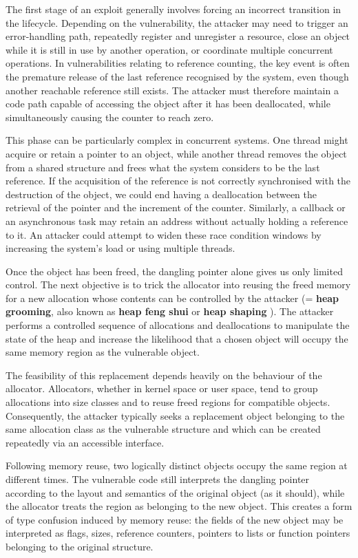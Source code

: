 \noindent The first stage of an exploit generally involves forcing an incorrect transition in the lifecycle. Depending on the vulnerability, the attacker may need to trigger an error-handling path, repeatedly register and unregister a resource, close an object while it is still in use by another operation, or coordinate multiple concurrent operations. In vulnerabilities relating to reference counting, the key event is often the premature release of the last reference recognised by the system, even though another reachable reference still exists. The attacker must therefore maintain a code path capable of accessing the object after it has been deallocated, while simultaneously causing the counter to reach zero.

This phase can be particularly complex in concurrent systems. One thread might acquire or retain a pointer to an object, while another thread removes the object from a shared structure and frees what the system considers to be the last reference. If the acquisition of the reference is not correctly synchronised with the destruction of the object, we could end having a deallocation between the retrieval of the pointer and the increment of the counter. Similarly, a callback or an asynchronous task may retain an address without actually holding a reference to it. An attacker could attempt to widen these race condition windows by increasing the system's load or using multiple threads.

Once the object has been freed, the dangling pointer alone gives us only limited control. The next objective is to trick the allocator into reusing the freed memory for a new allocation whose contents can be controlled by the attacker (= \textbf{heap grooming}, also known as \textbf{heap feng shui} or \textbf{heap shaping} \cite{bib:heap-grooming}). The attacker performs a controlled sequence of allocations and deallocations to manipulate the state of the heap and increase the likelihood that a chosen object will occupy the same memory region as the vulnerable object.

The feasibility of this replacement depends heavily on the behaviour of the allocator. Allocators, whether in kernel space or user space, tend to group allocations into size classes and to reuse freed regions for compatible objects. Consequently, the attacker typically seeks a replacement object belonging to the same allocation class as the vulnerable structure and which can be created repeatedly via an accessible interface.

Following memory reuse, two logically distinct objects occupy the same region at different times. The vulnerable code still interprets the dangling pointer according to the layout and semantics of the original object (as it should), while the allocator treats the region as belonging to the new object. This creates a form of type confusion induced by memory reuse: the fields of the new object may be interpreted as flags, sizes, reference counters, pointers to lists or function pointers belonging to the original structure.

